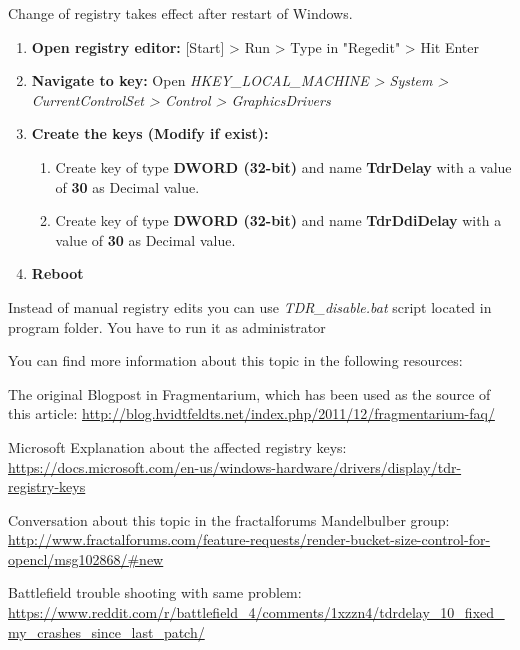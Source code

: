 Change of registry takes effect after restart of Windows.

\begin{enumerate}
	
	\item \textbf{Open registry editor:} [Start] > Run > Type in "Regedit" > Hit Enter
	\item \textbf{Navigate to key:} Open \emph{HKEY\_LOCAL\_MACHINE > System > CurrentControlSet > Control > GraphicsDrivers}
	\item \textbf{Create the keys (Modify if exist):}
	\begin{enumerate}
		\item Create key of type \textbf{DWORD (32-bit)} and name \textbf{TdrDelay} with a value of \textbf{30} as Decimal value.
		\item Create key of type \textbf{DWORD (32-bit)} and name \textbf{TdrDdiDelay} with a value of \textbf{30} as Decimal value.	
	\end{enumerate}	
	\item \textbf{Reboot}

\end{enumerate}

Instead of manual registry edits you can use \emph{TDR\_disable.bat} script located in program folder. You have to run it as administrator

You can find more information about this topic in the following resources:

The original Blogpost in Fragmentarium, which has been used as the source of this article: \url{http://blog.hvidtfeldts.net/index.php/2011/12/fragmentarium-faq/}

Microsoft Explanation about the affected registry keys: \url{https://docs.microsoft.com/en-us/windows-hardware/drivers/display/tdr-registry-keys}

Conversation about this topic in the fractalforums Mandelbulber group:
\url{http://www.fractalforums.com/feature-requests/render-bucket-size-control-for-opencl/msg102868/#new}

Battlefield trouble shooting with same problem:
\url{https://www.reddit.com/r/battlefield_4/comments/1xzzn4/tdrdelay_10_fixed_my_crashes_since_last_patch/}

%
% 
 
 